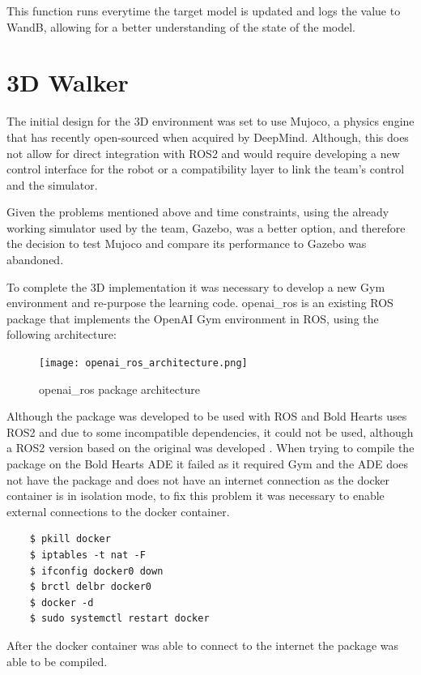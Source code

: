 This function runs everytime the target model is updated and logs the value to WandB, allowing for a better understanding of the state of the model.
\section{3D Walker}
The initial design for the 3D environment was set to use Mujoco, a physics engine that has recently open-sourced when acquired by DeepMind.
Although, this does not allow for direct integration with ROS2 and would require developing a new control interface for the robot or a compatibility layer to link the team's control and the simulator.

Given the problems mentioned above and time constraints, using the already working simulator used by the team, Gazebo, was a better option, and therefore the decision to test Mujoco and compare its performance to Gazebo was abandoned.

To complete the 3D implementation it was necessary to develop a new Gym environment and re-purpose the learning code. 
openai\_ros is an existing ROS package that implements the OpenAI Gym environment in ROS, using the following architecture:

\begin{figure}[H]
    \centering
    \texttt{[image: openai\_ros\_architecture.png]}
    \caption{openai\_ros package architecture\cite{ros-gym}}
\end{figure}

Although the package was developed to be used with ROS and Bold Hearts uses ROS2 and due to some incompatible dependencies, it could not be used, although a ROS2 version based on the original was developed \cite{openairos_2}. 
When trying to compile the package on the Bold Hearts ADE it failed as it required Gym and the ADE does not have the package and does not have an internet connection as the docker container is in isolation mode, to fix this problem it was necessary to enable external connections to the docker container.

\begin{lstlisting}
    $ pkill docker
    $ iptables -t nat -F
    $ ifconfig docker0 down
    $ brctl delbr docker0
    $ docker -d
    $ sudo systemctl restart docker
\end{lstlisting}

After the docker container was able to connect to the internet the package was able to be compiled.


